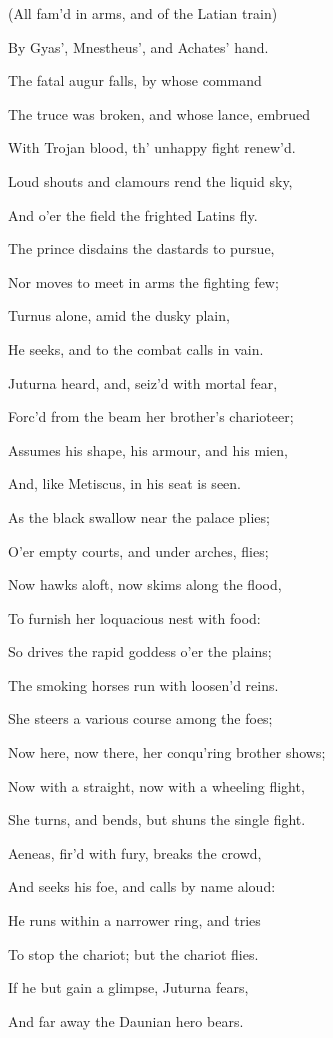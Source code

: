 (All fam’d in arms, and of the Latian train)

By Gyas’, Mnestheus’, and Achates’ hand.

The fatal augur falls, by whose command

The truce was broken, and whose lance, embrued

With Trojan blood, th’ unhappy fight renew’d.

Loud shouts and clamours rend the liquid sky,

And o’er the field the frighted Latins fly.

The prince disdains the dastards to pursue,

Nor moves to meet in arms the fighting few;

Turnus alone, amid the dusky plain,

He seeks, and to the combat calls in vain.

Juturna heard, and, seiz’d with mortal fear,

Forc’d from the beam her brother’s charioteer;

Assumes his shape, his armour, and his mien,

And, like Metiscus, in his seat is seen.

As the black swallow near the palace plies;

O’er empty courts, and under arches, flies;

Now hawks aloft, now skims along the flood,

To furnish her loquacious nest with food:

So drives the rapid goddess o’er the plains;

The smoking horses run with loosen’d reins.

She steers a various course among the foes;

Now here, now there, her conqu’ring brother shows;

Now with a straight, now with a wheeling flight,

She turns, and bends, but shuns the single fight.

Aeneas, fir’d with fury, breaks the crowd,

And seeks his foe, and calls by name aloud:

He runs within a narrower ring, and tries

To stop the chariot; but the chariot flies.

If he but gain a glimpse, Juturna fears,

And far away the Daunian hero bears.

